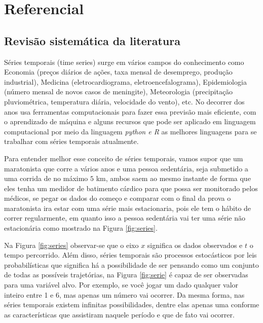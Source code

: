 \section{Referencial}\label{sec:refteo}

    

\subsection{Revis\~ao sistem\'atica da literatura} \label{subsec:revisão}

Séries temporais (time series) surge em vários campos do conhecimento como Economia (preços diários de ações, taxa mensal de desemprego, produção industrial), Medicina (eletrocardiograma, eletroencefalograma), Epidemiologia (número mensal de novos casos de meningite), Meteorologia (precipitação pluviométrica, temperatura diária, velocidade do vento), etc. No decorrer dos anos usa ferramentas computacionais para fazer essa previsão mais eficiente, com o aprendizado de máquina e alguns recursos que pode ser aplicado em linguagem computacional por meio da linguagem \textit{python e R}  as melhores linguagens para se trabalhar com séries temporais atualmente.

Para entender melhor esse conceito de séries temporais, vamos supor que um maratonista que corre a vários anos e uma pessoa sedentária, seja submetido a uma corrida de no máximo $5$ km, ambos saem ao mesmo instante de forma que eles tenha um medidor de batimento cárdico para que possa ser monitorado pelos médicos, se pegar os dados do começo e comparar com o final da prova o maratonista ira estar com uma série mais estacionaria, pois ele tem o hábito de correr regularmente, em quanto isso a pessoa sedentária vai ter uma série não estacionária como mostrado na Figura \ref{fig:series}.



Na Figura \ref{fig:series} observar-se que o eixo $x$ significa os dados observados e $t$ o tempo percorrido.
Além disso, séries temporais são processos estocásticos por leis probabilísticas que significa há a possibilidade de ser pensando como um conjunto de todas as possíveis trajetórias, na Figura \ref{fig:serie} é capaz de ser observadas para uma variável alvo. Por exemplo, se você jogar um dado qualquer valor inteiro entre 1 e 6, mas apenas um número vai ocorrer. Da mesma forma, nas séries temporais existem infinitas possibilidades, dentre elas apenas uma conforme as características que assistiram naquele período e que de fato vai ocorrer.

